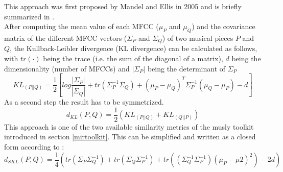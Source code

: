 This approach was first proposed by Mandel and Ellis \cite{mandelellis1} in 2005 and is briefly summarized in \cite[pp. 65f]{knees1}.\\
After computing the mean value of each MFCC ($\mu_P$ and $\mu_Q$) and the covariance matrix of the different MFCC vectors ($\Sigma_P$ and $\Sigma_Q$) of two musical pieces $P$ and $Q$, the Kullback-Leibler divergence (KL divergence) can be calculated as follows, with $tr(\cdot)$ being the trace (i.e. the sum of the diagonal of a matrix), $d$ being the dimensionality (number of MFCCs) and $|\Sigma_P|$ being the determinant of $\Sigma_P$\\
\begin{equation} \label{eq:KL1}
KL_{(P||Q)} = \frac{1}{2}[log\frac{|\Sigma_P|}{|\Sigma_Q|} + tr(\Sigma_P^{-1}\Sigma_Q) + (\mu_P - \mu_Q)^T \Sigma_P^{-1} (\mu_Q - \mu_P) - d]
\end{equation}
As a second step the result has to be symmetrized.
\begin{equation} \label{eq:KL2}
d_{KL}(P, Q) = \frac{1}{2} (KL_{(P||Q)} + KL_{(Q||P)}) 
\end{equation}
This approach is one of the two available similarity metrics of the musly \cite{musly1} toolkit introduced in section \ref{mirtoolkit}.
This can be simplified and written as a closed form according to \cite[p. 44]{schnitzer1}:
\begin{equation} \label{eq:SKL}
d_{SKL}(P, Q) = \frac{1}{4} (tr(\Sigma_P\Sigma_Q^{-1}) + tr(\Sigma_Q\Sigma_P^{-1}) + tr((\Sigma_Q^{-1}\Sigma_P^{-1})(\mu_P - \mu2)^2) - 2d)
\end{equation}

